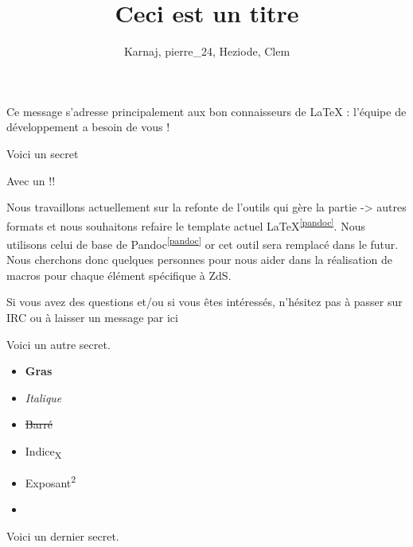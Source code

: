 \documentclass[small]{zmdocument}
\title{Ceci est un titre}
\author{Karnaj, pierre\_24, Heziode, Clem}
\begin{document}
\maketitle
\tableofcontents
\newpage

\levelOneIntroduction

Ce message s’adresse principalement aux bon connaisseurs de LaTeX : l’équipe de développement a besoin de vous ! 

\begin{Spoiler}
Voici un secret

Avec un !!
\end{Spoiler}


Nous travaillons actuellement sur la refonte de l’outils qui gère la partie  -> autres formats et nous souhaitons refaire le template actuel LaTeX\textsuperscript{\ref{pandoc}}. Nous utilisons celui de base de Pandoc\textsuperscript{\ref{pandoc}} or cet outil sera remplacé dans le futur. Nous cherchons donc quelques personnes pour nous aider dans la réalisation de macros pour chaque élément spécifique à ZdS.


Si vous avez des questions et/ou si vous êtes intéressés, n’hésitez pas à passer sur IRC ou à laisser un message par ici 

\begin{Spoiler}
Voici un autre secret.
\end{Spoiler}


\begin{itemize}
\item \textbf{Gras}
\item \textit{Italique}
\item \sout{Barré}
\item Indice\textsubscript{X}
\item Exposant\textsuperscript{2}
\item {}
\end{itemize}

\begin{Spoiler}
Voici un dernier secret.
\end{Spoiler}
\end{document}

